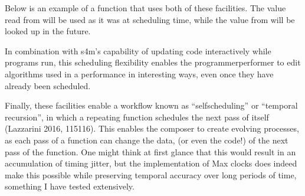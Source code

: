 \documentclass[letterpaper,10pt,english]{sphinxmanual}
\begin{document}
\sphinxAtStartPar
Below is an example of a function that uses both of these facilities.
The value read from  will be used as it was at scheduling
time, while the value from  will be looked up in the future.

\begin{sphinxVerbatim}[commandchars=\\\{\}]
\end{sphinxVerbatim}

\sphinxAtStartPar
In combination with s4m’s capability of updating code interactively while
programs run, this scheduling flexibility enables the programmer\sphinxhyphen{}performer
to edit algorithms used in a performance in interesting ways, even once
they have already been scheduled.

\sphinxAtStartPar
Finally, these facilities enable a workflow known as
“self\sphinxhyphen{}scheduling” or “temporal recursion”,
in which a repeating function schedules the next pass of itself (Lazzarini 2016, 115\sphinxhyphen{}116).
This enables the composer to create evolving
processes, as each pass of a function can change the data,
(or even the code!) of the next pass of the function. One might think
at first glance that this would result in an accumulation of timing
jitter, but the implementation of Max clocks does indeed make this possible
while preserving temporal accuracy over long periods of time, something
I have tested extensively.
\end{document}

